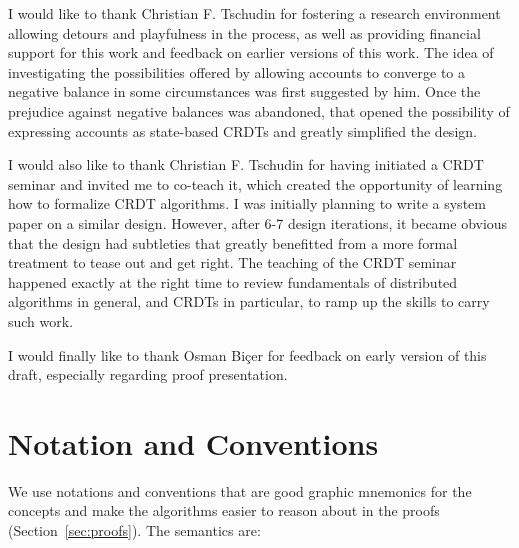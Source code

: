\documentclass[9pt]{article}   	%
\begin{document}
I would like to thank Christian F. Tschudin for fostering a research environment allowing detours and playfulness in the process, as well as providing financial support for this work and feedback on earlier versions of this work. The idea of investigating the possibilities offered by allowing accounts to converge to a negative balance in some circumstances was first suggested by him. Once the prejudice against negative balances was abandoned, that opened the possibility of expressing accounts as state-based CRDTs and greatly simplified the design.

I would also like to thank Christian F. Tschudin for having initiated a CRDT seminar and invited me to co-teach it, which created the opportunity of learning how to formalize CRDT algorithms. I was initially planning to write a system paper on a similar design. However, after 6-7 design iterations, it became obvious that the design had subtleties that greatly benefitted from a more formal treatment to tease out and get right. The teaching of the CRDT seminar happened exactly at the right time to review fundamentals of distributed algorithms in general, and CRDTs in particular, to ramp up the skills to carry such work.

I would finally like to thank Osman Biçer for feedback on early version of this draft, especially regarding proof presentation.



\newpage




\newpage
\appendix




\section{Notation and Conventions}
\label{apdx:notation}

We use notations and conventions that are good graphic mnemonics for the concepts and make the algorithms easier to reason about in the proofs (Section~\ref{sec:proofs}). The semantics are:
\end{document}
